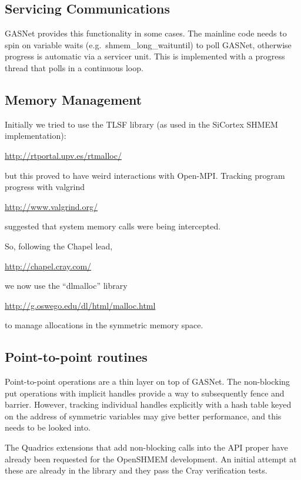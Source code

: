 \documentclass[english]{article}
\newcommand{\openshmem} {\mbox{OpenSHMEM}\xspace}
\begin{document}
\subsection{Servicing Communications}

GASNet provides this functionality in some cases. The mainline code
needs to spin on variable waits (e.g.\ shmem\_long\_waituntil) to poll
GASNet, otherwise progress is automatic via a servicer unit.  This is
implemented with a progress thread that polls in a continuous loop.

\subsection{Memory Management}

Initially we tried to use the TLSF library (as used in the SiCortex
SHMEM implementation):

\url{http://rtportal.upv.es/rtmalloc/}

but this proved to have weird interactions with Open-MPI. Tracking
program progress with valgrind

\url{http://www.valgrind.org/}

suggested that system memory calls were
being intercepted.

So, following the Chapel lead,

\url{http://chapel.cray.com/}

we now use the ``dlmalloc'' library

\url{http://g.oswego.edu/dl/html/malloc.html}

to manage allocations in the symmetric memory space.

\subsection{Point-to-point routines}

Point-to-point operations are a thin layer on top of GASNet. The
non-blocking put operations with implicit handles provide a way to
subsequently fence and barrier. However, tracking individual handles
explicitly with a hash table keyed on the address of symmetric
variables may give better performance, and this needs to be looked
into.

The Quadrics extensions that add non-blocking calls into the API
proper have already been requested for the \openshmem development. An
initial attempt at these are already in the library and they pass the
Cray verification tests.
\end{document}
